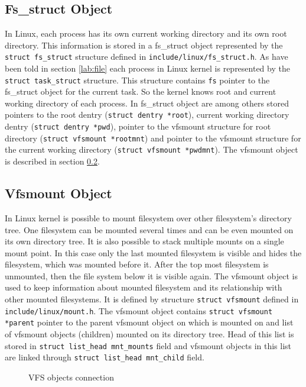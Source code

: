 \subsection{Fs\_struct Object}
In Linux, each process has its own current working directory and its own root
directory. This information is stored in a fs\_struct object represented by the
\texttt{struct fs\_struct} structure defined in \texttt{include/linux/fs\_struct.h}.
As have been told in section \ref{lab:file} each process in Linux kernel is
represented by the \texttt{struct task\_struct} structure. This structure contains
\texttt{fs} pointer to the fs\_struct object for the current task. So the kernel knows
root and current working directory of each process. In fs\_struct object are among
others stored pointers to the root dentry (\texttt{struct dentry *root}),
current working directory dentry (\texttt{struct dentry *pwd}), pointer to the
vfsmount structure for root directory (\texttt{struct vfsmount *rootmnt}) and pointer
to the vfsmount structure for the current working directory (\texttt{struct vfsmount
*pwdmnt}). The vfsmount object is described in section \ref{lab:vfsmount}.

\subsection{Vfsmount Object}
\label{lab:vfsmount}
In Linux kernel is possible to mount filesystem over other filesystem's directory
tree. One filesystem can be mounted several times and can be even mounted on its own
directory tree. It is also possible to stack multiple mounts on a single mount point.
In this case only the last mounted filesystem is visible and hides the filesystem,
which was mounted before it. After the top most filesystem is unmounted, then the file
system below it is visible again. The vfsmount object is used to keep information
about mounted filesystem and its relationship with other mounted filesystems. It is
defined by structure \texttt{struct vfsmount} defined in
\texttt{include/linux/mount.h}. The vfsmount object contains \texttt{struct
vfsmount *parent} pointer to the parent vfsmount object on which is mounted on and
list of vfsmount objects (children) mounted on its directory tree. Head of this list
is stored in \texttt{struct list\_head mnt\_mounts} field and vfsmount objects in this
list are linked through \texttt{struct list\_head mnt\_child} field. \\

\begin{figure}[h]
	\begin{center}
		
	\end{center}
	\caption{VFS objects connection}
	\label{fig:vfs_struct}
\end{figure}

